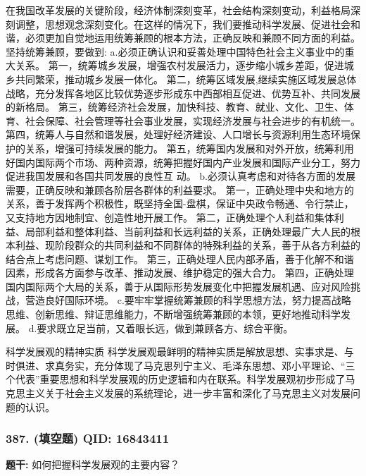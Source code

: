 \documentclass[12pt,UTF8]{ctexart}
\begin{document}
在我国改革发展的关键阶段，经济体制深刻变革，社会结构深刻变动，利益格局深刻调整，思想观念深刻变化。在这样的情况下，我们要推动科学发展、促进社会和谐，必须更加自觉地运用统筹兼顾的根本方法，正确反映和兼顾不同方面的利益。坚持统筹兼顾，要做到:
a.必须正确认识和妥善处理中国特色社会主义事业中的重大关系。
第一，统筹城乡发展，增强农村发展活力，逐步缩小城乡差距，促进城乡共同繁荣，推动城乡发展一体化。
第二，统筹区域发展,继续实施区域发展总体战略，充分发挥各地区比较优势逐步形成东中西部相互促进、优势互补、共同发展的新格局。
第三，统筹经济社会发展，加快科技、教育、就业、文化、卫生、体育、社会保障、社会管理等社会事业发展，实现经济发展与社会进步的有机统一。
第四，统筹人与自然和谐发展，处理好经济建设、人口增长与资源利用生态环境保护的关系，增强可持续发展的能力。
第五，统筹国内发展和对外开放，统筹利用好国内国际两个市场、两种资源，统筹把握好国内产业发展和国际产业分工，努力促进我国发展和各国共同发展的良性互
动。
b.必须认真考虑和对待各方面的发展需要，正确反映和兼顾各阶层各群体的利益要求。
第一，正确处理中央和地方的关系，善于发挥两个积极性，既坚持全国-盘棋，保证中央政令畅通、令行禁止，又支持地方因地制宜、创造性地开展工作。
第二，正确处理个人利益和集体利益、局部利益和整体利益、当前利益和长远利益的关系，正确处理最广大人民的根本利益、现阶段群众的共同利益和不同群体的特殊利益的关系，善于从各方利益的结合点上考虑问题、谋划工作。
第三，正确处理人民内部矛盾，善于化解不和谐因素，形成各方面参与改革、推动发展、维护稳定的强大合力。
第四，正确处理国内国际两个大局的关系，善于从国际形势发展变化中把握发展机遇、应对风险挑战，营造良好国际环境。
c.要牢牢掌握统筹兼顾的科学思想方法，努力提高战略思维、创新思维、辩证思维能力，不断增强统筹兼顾的本领，更好地推动科学发展。
d.要求既立足当前，又着眼长远，做到兼顾各方、综合平衡。

科学发展观的精神实质
科学发展观最鲜明的精神实质是解放思想、实事求是、与时俱进、求真务实，充分体现了马克思列宁主义、毛泽东思想、邓小平理论、“三个代表”重要思想和科学发展观的历史逻辑和内在联系。科学发展观初步形成了马克思主义关于社会主义发展的系统理论，进一步丰富和深化了马克思主义对发展问题的认识。

\vspace{0.3em}\hrulefill\vspace{0.7em}

\subsubsection*{387. (填空题) \small QID: 16843411}

\textbf{题干:}
如何把握科学发展观的主要内容？
\end{document}

